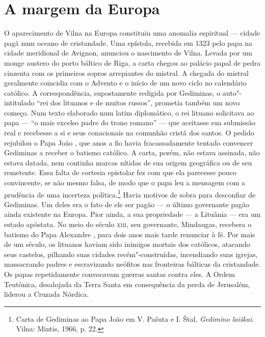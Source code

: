 \chapter{A margem da Europa}

\begin{epigraphs} 
\end{epigraphs}

O aparecimento de Vilna na Europa constituiu uma anomalia espiritual ---
cidade pagã num oceano de cristandade. Uma epístola, recebida em 1323
pelo papa na cidade meridional de Avignon, anunciou o nascimento de
Vilna. Levada por um monge austero do porto báltico de Riga, a carta
chegou ao palácio papal de pedra cinzenta com os primeiros sopros
arrepiantes do mistral. A chegada do mistral geralmente coincidia com o
Advento e o início de um novo ciclo no calendário católico. A
correspondência, supostamente redigida por Gediminas, o auto"-intitulado
``rei dos lituanos e de muitos russos'', prometia também um novo começo.
Num texto elaborado num latim diplomático, o rei lituano solicitava ao
papa --- ``o mais excelso padre do trono romano'' --- que aceitasse sua
submissão real e recebesse a si e seus conacionais na comunhão cristã
dos santos. O pedido rejubilou o Papa João , que anos a fio havia
fracassadamente tentado convencer Gediminas a receber o batismo
católico. A carta, porém, não estava assinada, não estava datada, nem
continha marcas nítidas de sua origem geográfica ou de seu remetente.
Essa falta de cortesia epistolar fez com que ela parecesse pouco
convincente, se não mesmo falsa, de modo que o papa leu a mensagem com a
prudência de uma incerteza política.\footnote{Carta de Gediminas ao Papa João  em V. Pašuta e I. Štal, \textit{Gedimino laiškai}. Vilna: Mintis, 1966, p. 22.}
Havia motivos de sobra para desconfiar de Gediminas. Um deles era o fato
de ele ser pagão --- o último governante pagão ainda existente na Europa.
Pior ainda, a sua propriedade --- a Lituânia --- era um estado apóstata. No
meio do século \textsc{xiii}, seu governante, Mindaugas, recebera o batismo do Papa
Alexandre , para dois anos mais tarde renunciar à fé. Por mais de um
século, os lituanos haviam sido inimigos mortais dos católicos, atacando
seus castelos, pilhando suas cidades recém"-construídas, incendiando suas
igrejas, massacrando padres e escravizando neófitos nas fronteiras
bálticas da cristandade. Os papas repetidamente convocavam guerras
santas contra eles. A Ordem Teutônica, desalojada da Terra Santa em
consequência da perda de Jerusalém, liderou a Cruzada Nórdica.

